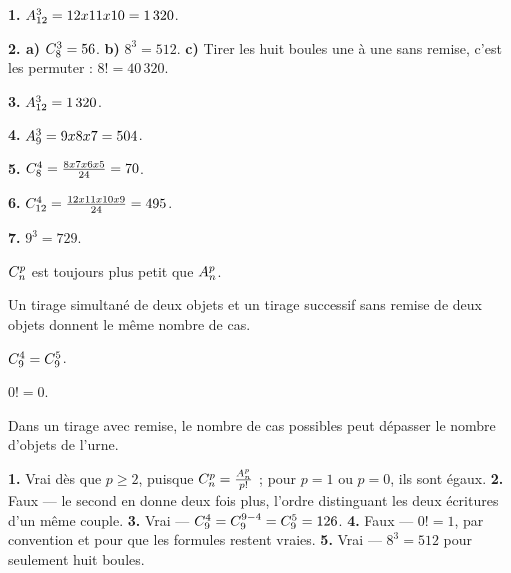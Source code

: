 \begin{corrige}[annales]
\textbf{1.} $\arrang{3}{12} = 12\times11\times10 = 1\,320$. \checkmark

\textbf{2. a)} $\combi{3}{8} = 56$. \quad \textbf{b)} $8^{3} = 512$. \quad
\textbf{c)} Tirer les huit boules une à une sans remise, c'est les
permuter : $8! = 40\,320$.

\textbf{3.} $\arrang{3}{12} = 1\,320$.

\textbf{4.} $\arrang{3}{9} = 9\times8\times7 = 504$. \checkmark

\textbf{5.} $\combi{4}{8} = \frac{8\times7\times6\times5}{24} = 70$.

\textbf{6.} $\combi{4}{12} = \frac{12\times11\times10\times9}{24} = 495$.

\textbf{7.} $9^{3} = 729$.
\end{corrige}

\begin{vraifaux}
\exo $\combi{p}{n}$ est toujours plus petit que $\arrang{p}{n}$.

\exo Un tirage simultané de deux objets et un tirage successif sans remise
de deux objets donnent le même nombre de cas.

\exo $\combi{4}{9} = \combi{5}{9}$.

\exo $0! = 0$.

\exo Dans un tirage avec remise, le nombre de cas possibles peut dépasser le
nombre d'objets de l'urne.
\end{vraifaux}

\begin{corrige}
\textbf{1.} Vrai dès que $p \geq 2$, puisque
$\combi{p}{n} = \frac{\arrang{p}{n}}{p!}$ ; pour $p = 1$ ou $p = 0$, ils
sont égaux.
\textbf{2.} Faux — le second en donne deux fois plus, l'ordre distinguant
les deux écritures d'un même couple.
\textbf{3.} Vrai — $\combi{4}{9} = \combi{9-4}{9} = \combi{5}{9} = 126$.
\textbf{4.} Faux — $0! = 1$, par convention et pour que les formules
restent vraies.
\textbf{5.} Vrai — $8^{3} = 512$ pour seulement huit boules.
\end{corrige}

